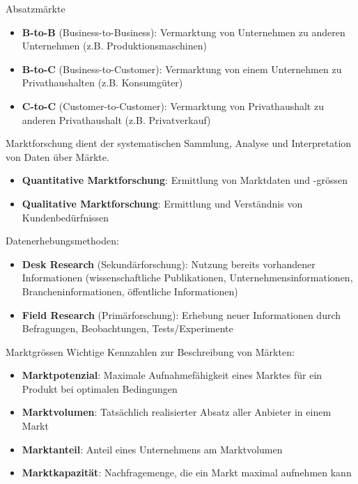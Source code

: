 \begin{concept}{Absatzmärkte}
\begin{itemize}
    \item \textbf{B-to-B} (Business-to-Business): Vermarktung von Unternehmen zu anderen Unternehmen (z.B. Produktionsmaschinen)
    \item \textbf{B-to-C} (Business-to-Customer): Vermarktung von einem Unternehmen zu Privathaushalten (z.B. Konsumgüter)
    \item \textbf{C-to-C} (Customer-to-Customer): Vermarktung von Privathaushalt zu anderen Privathaushalt (z.B. Privatverkauf)
\end{itemize}
\end{concept}

\begin{definition}{Marktforschung} dient der systematischen Sammlung, Analyse und Interpretation von Daten über Märkte.
\begin{itemize}
    \item \textbf{Quantitative Marktforschung}: Ermittlung von Marktdaten und -grössen
    \item \textbf{Qualitative Marktforschung}: Ermittlung und Verständnis von Kundenbedürfnissen
\end{itemize}

Datenerhebungsmethoden:
\begin{itemize}
    \item \textbf{Desk Research} (Sekundärforschung): Nutzung bereits vorhandener Informationen (wissenschaftliche Publikationen, Unternehmensinformationen, Brancheninformationen, öffentliche Informationen)
    \item \textbf{Field Research} (Primärforschung): Erhebung neuer Informationen durch Befragungen, Beobachtungen, Tests/Experimente
\end{itemize}
\end{definition}

\begin{definition}{Marktgrössen}
Wichtige Kennzahlen zur Beschreibung von Märkten:
\begin{itemize}
    \item \textbf{Marktpotenzial}: Maximale Aufnahmefähigkeit eines Marktes für ein Produkt bei optimalen Bedingungen
    \item \textbf{Marktvolumen}: Tatsächlich realisierter Absatz aller Anbieter in einem Markt
    \item \textbf{Marktanteil}: Anteil eines Unternehmens am Marktvolumen
    \item \textbf{Marktkapazität}: Nachfragemenge, die ein Markt maximal aufnehmen kann
\end{itemize}
\end{definition}

